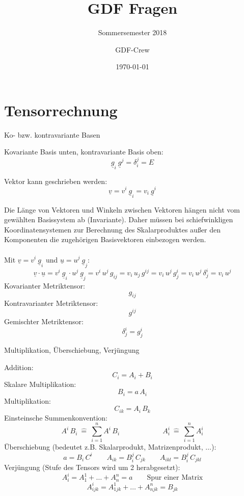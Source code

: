 \documentclass[twocolumn, fontsize=8pt, DIV=1]{scrartcl}
\title{GDF Fragen}
\subtitle{Sommersemester 2018}
\author{GDF-Crew}
\date{\today}
\begin{document}
\maketitle







\section{Tensorrechnung}




\begin{framed}
    Ko- bzw. kontravariante Basen
\end{framed}
Kovariante Basis unten, kontravariante Basis oben:
\[ \underline{g}_{i}\ \underline{g}^{j} = \delta_i^j = E \]

Vektor kann geschrieben werden:
\[ 
 \underline{v} = v^i \ \underline{g}_i = v_i \ \underline{g}^i 
\]

Die Länge von Vektoren und Winkeln zwischen Vektoren hängen nicht vom gewählten Basissystem ab (Invariante). Daher müssen bei schiefwinkligen Koordinatensystemen zur Berechnung des Skalarproduktes außer den Komponenten die zugehörigen Basisvektoren einbezogen werden.\\
\ \\
Mit $\underline{v} = v^i \ \underline{g}_i$ und $\underline{u} = u^j\ \underline{g}_j$:
\[
\underline{v} \cdot \underline{u} = v^i \ \underline{g}_i \cdot u^j\ \underline{g}_j
= v^i\, u^j\, g_{ij}
= v_i\, u_j\, g^{ij}
= v_i\, u^j\, g^i_j
= v_i\, u^j\, \delta^i_j
= v_i\, u^j
\]
Kovarianter Metriktensor: \[g_{ij}\]
Kontravarianter Metriktensor: \[g^{ij}\]
Gemischter Metriktensor: \[\delta^i_j = g^i_j\]



\begin{framed}
    Multiplikation, Überschiebung, Verjüngung
\end{framed}
Addition:
\[
    C_i = A_i + B_i
\]
Skalare Multiplikation:
\[
    B_i = a\, A_i
\]
Multiplikation:
\[
    C_{ik} = A_i\, B_k
\]
Einsteinsche Summenkonvention:
\[
    A^i\, B_i\ \hat{=}\ \sum_{i=1}^n A^i\, B_i
    \qquad\qquad\qquad
    A^i_i\ \hat{=}\ \sum_{i=1}^n A^i_i
\]
Überschiebung (bedeutet z.B. Skalarprodukt, Matrizenprodukt, $\dots$):
\[
    a = B_i\, C^i
    \qquad
    A_{ik} = B_i^j\, C_{jk}
    \qquad
    A_{ikl} = B_i^j\, C_{jkl}
\]
Verjüngung (Stufe des Tensors wird um 2 herabgesetzt):
\[
    A^i_i = A^1_1 + \dots + A^n_n = a \qquad \text{Spur einer Matrix}
\]
\[
    A^i_{ijk} = A^1_{1jk} + \dots + A^n_{njk} = B_{jk}
\]
\end{document}
